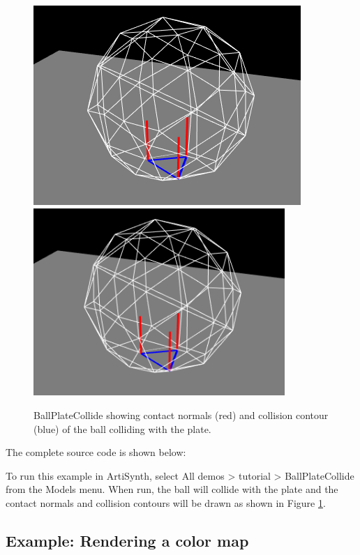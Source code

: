\begin{figure}[ht]
\begin{center}
\iflatexml
 \includegraphics[]{images/BallPlateCollide}
\else
 \includegraphics[width=3.75in]{images/BallPlateCollide}
\fi
\end{center}
\caption{BallPlateCollide showing contact normals (red) and collision contour
(blue) of the ball colliding with the plate.}
\label{BallPlateCollide:fig}
\end{figure}

The complete source code is shown below:
%
\lstset{numbers=left}

\lstset{numbers=none}

To run this example in ArtiSynth, select {\sf All demos > tutorial >
BallPlateCollide} from the {\sf Models} menu. When run, the ball
will collide with the plate and the contact normals and collision 
contours will be drawn as shown in Figure \ref{BallPlateCollide:fig}.

\subsection{Example: Rendering a color map}
\label{renderingDepth:sec}

